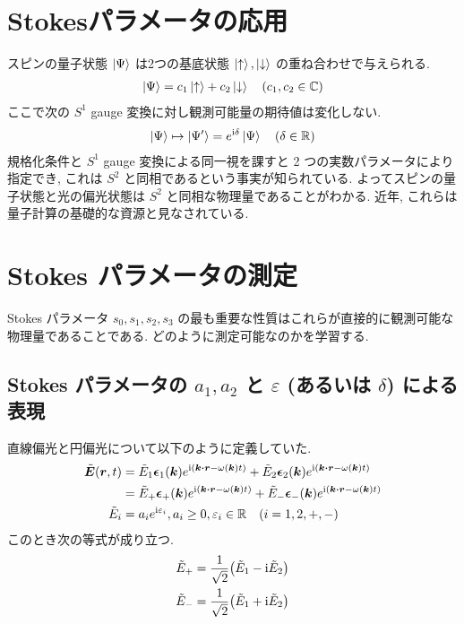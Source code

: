 \documentclass[uplatex,a4paper,dvipdfmx]{jsarticle}
\theoremstyle{definition}
\begin{document}
\section{Stokesパラメータの応用}
スピンの量子状態 $\ket{\Psi}$ は2つの基底状態 $\ket{\uparrow}, \ket{\downarrow}$ の重ね合わせで与えられる.
\begin{align}
  \ket{\Psi} = c_1\ket{\uparrow} + c_2\ket{\downarrow} \quad (c_1, c_2 \in \mathbb{C})
\end{align}
ここで次の $S^1$ gauge 変換に対し観測可能量の期待値は変化しない.
\begin{align}
  \ket{\Psi} \mapsto \ket{\Psi'} = e^{\mathrm{i}\delta}\ket{\Psi} \quad (\delta\in\mathbb{R})
\end{align}
規格化条件と $S^1$ gauge 変換による同一視を課すと 2 つの実数パラメータにより指定でき, これは $S^2$ と同相であるという事実が知られている. よってスピンの量子状態と光の偏光状態は $S^2$ と同相な物理量であることがわかる. 近年, これらは量子計算の基礎的な資源と見なされている.

\section{Stokes パラメータの測定}
Stokes パラメータ $s_0, s_1, s_2, s_3$ の最も重要な性質はこれらが直接的に観測可能な物理量であることである. どのように測定可能なのかを学習する.
\subsection{Stokes パラメータの $a_1, a_2$ と $\varepsilon$ (あるいは $\delta$) による表現}
直線偏光と円偏光について以下のように定義していた.
\begin{align}
  \tilde{\EE}(\rr, t) & = \tilde{E}_1\ee_1(\kk)e^{\ii(\kk\vdot\rr - \omega(\kk)t)} + \tilde{E}_2\ee_2(\kk)e^{\ii(\kk\vdot\rr - \omega(\kk)t)} \label{ET line def}   \\
                      & = \tilde{E}_+\ee_+(\kk)e^{\ii(\kk\vdot\rr - \omega(\kk)t)} + \tilde{E}_-\ee_-(\kk)e^{\ii(\kk\vdot\rr - \omega(\kk)t)} \label{ET circle def} \\
  \tilde{E}_i         & = a_ie^{\ii\varepsilon_i}, a_i \geq 0, \varepsilon_i\in\RR \quad (i = 1, 2, +, -)
\end{align}
このとき次の等式が成り立つ.
\begin{align}
  \tilde{E}_+ & = \frac{1}{\sqrt{2}}\qty(\tilde{E}_1 - \mathrm{i}\tilde{E}_2) \\
  \tilde{E}_- & = \frac{1}{\sqrt{2}}\qty(\tilde{E}_1 + \mathrm{i}\tilde{E}_2)
\end{align}
\\
\end{document}
